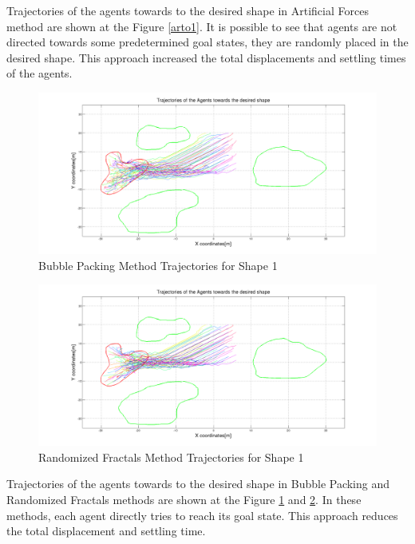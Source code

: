 Trajectories of the agents towards to the desired shape in Artificial Forces method are shown at the Figure \ref{arto1}. It is possible to see that agents are not directed towards some predetermined goal states, they are randomly placed in the desired shape. This approach increased the total displacements and settling times of the agents. 

\begin{figure}[H]
\caption{Bubble Packing Method Trajectories for Shape 1}
\centerline{\includegraphics[scale = 0.32]{Bubble_Trajectories_1}} \label{bubble1}
\end{figure} 	
		
\begin{figure}[H]
\caption{Randomized Fractals Method Trajectories for Shape 1} \label{randomiz1}
\centerline{\includegraphics[scale = 0.32]{Randomized_Trajectories_1}}
\end{figure} 	

Trajectories of the agents towards to the desired shape in Bubble Packing and Randomized Fractals methods are shown at the Figure \ref{bubble1} and \ref{randomiz1}. In these methods, each agent directly tries to reach its goal state. This approach reduces the total displacement and settling time.
			
